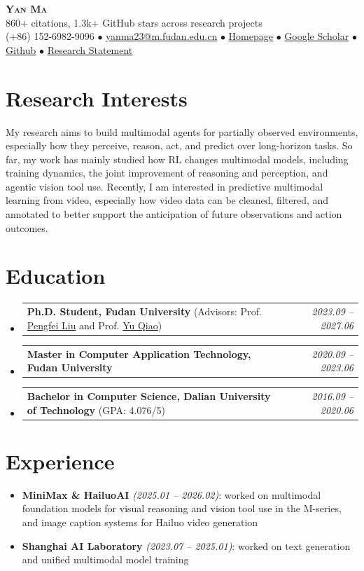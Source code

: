 \documentclass[letterpaper,11pt]{article}
\makeatletter
\newcommand{\ExperienceListStart}{
    \vspace{-1pt}\begin{itemize}[leftmargin=1.2em,itemsep=1pt,topsep=0pt,parsep=0pt]
}
\newcommand{\ExperienceListEnd}{
    \end{itemize}\vspace{-5pt}
}
\newcommand{\Experience}[3]{
    \item \small \textbf{#1} \textit{(#2)}: #3
}
\newcommand{\EducationEntry}[2]{
  \vspace{-1pt}\item
    \begin{tabular*}{0.97\textwidth}[t]{@{}>{\raggedright\arraybackslash}p{0.78\textwidth}@{\extracolsep{\fill}}r@{}}
      \small #1 & \small\textit{#2} \\
    \end{tabular*}\vspace{-7pt}
}
\newcommand{\educationListStart}{\begin{itemize}[leftmargin=*, itemsep=0pt, topsep=0pt, parsep=0pt]}
\newcommand{\educationListEnd}{\end{itemize}}
\makeatother
\begin{document}
\begin{center}
{\LARGE \scshape \bfseries Yan Ma} \\ \vspace{2pt}
{\footnotesize 860+ citations, 1.3k+ GitHub stars across research projects} \\ \vspace{2pt}
(+86) 152-6982-9096 $\bullet$ 
\href{mailto:yanma23@m.fudan.edu.cn}{yanma23@m.fudan.edu.cn} $\bullet$
\href{https://yanmaaaa.github.io}{Homepage} $\bullet$
\href{https://scholar.google.com/citations?user=tnJyAAoAAAAJ\&hl=en}{Google Scholar} $\bullet$
\href{https://github.com/mantle2048}{Github} $\bullet$
\href{https://yanmaaaa.github.io/assets/research_statement.pdf}{Research Statement}
\end{center}


\section{Research Interests}
    My research aims to build multimodal agents for partially observed environments, especially how they perceive, reason, act, and predict over long-horizon tasks. So far, my work has mainly studied how RL changes multimodal models, including training dynamics, the joint improvement of reasoning and perception, and agentic vision tool use. Recently, I am interested in predictive multimodal learning from video, especially how video data can be cleaned, filtered, and annotated to better support the anticipation of future observations and action outcomes.


\section{Education}
  \educationListStart
    \EducationEntry{\textbf{Ph.D. Student, Fudan University} (Advisors: Prof. \href{https://scholar.google.co.jp/citations?user=oIz_CYEAAAAJ\&hl=en}{Pengfei Liu} and Prof. \href{https://mmlab.siat.ac.cn/yuqiao}{Yu Qiao})}{2023.09 -- 2027.06}
    \EducationEntry{\textbf{Master in Computer Application Technology, Fudan University}}{2020.09 -- 2023.06}
    \EducationEntry{\textbf{Bachelor in Computer Science, Dalian University of Technology} (GPA: 4.076/5)}{2016.09 -- 2020.06}
  \educationListEnd

\section{Experience}
  \ExperienceListStart
    \Experience{MiniMax \& HailuoAI}{2025.01 -- 2026.02}{worked on multimodal foundation models for visual reasoning and vision tool use in the M-series, and image caption systems for Hailuo video generation}
    \Experience{Shanghai AI Laboratory}{2023.07 -- 2025.01}{worked on text generation and unified multimodal model training}
  \ExperienceListEnd
\end{document}
